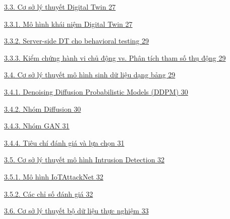 \hyperref[cux1a1-sux1edf-luxfd-thuyux1ebft-digital-twin]{3.3. Cơ sở lý thuyết Digital Twin \hyperref[cux1a1-sux1edf-luxfd-thuyux1ebft-digital-twin]{27}}

\hyperref[muxf4-huxecnh-khuxe1i-niux1ec7m-digital-twin]{3.3.1. Mô hình khái niệm Digital Twin \hyperref[muxf4-huxecnh-khuxe1i-niux1ec7m-digital-twin]{27}}

\hyperref[server-side-dt-cho-behavioral-testing]{3.3.2. Server-side DT cho behavioral testing \hyperref[server-side-dt-cho-behavioral-testing]{29}}

\hyperref[kiux1ec3m-chux1ee9ng-huxe0nh-vi-chux1ee7-ux111ux1ed9ng-vs.-phuxe2n-tuxedch-tham-sux1ed1-thux1ee5-ux111ux1ed9ng]{3.3.3. Kiểm chứng hành vi chủ động vs. Phân tích tham số thụ động \hyperref[kiux1ec3m-chux1ee9ng-huxe0nh-vi-chux1ee7-ux111ux1ed9ng-vs.-phuxe2n-tuxedch-tham-sux1ed1-thux1ee5-ux111ux1ed9ng]{29}}

\hyperref[cux1a1-sux1edf-luxfd-thuyux1ebft-muxf4-huxecnh-sinh-dux1eef-liux1ec7u-dux1ea1ng-bux1ea3ng]{3.4. Cơ sở lý thuyết mô hình sinh dữ liệu dạng bảng \hyperref[cux1a1-sux1edf-luxfd-thuyux1ebft-muxf4-huxecnh-sinh-dux1eef-liux1ec7u-dux1ea1ng-bux1ea3ng]{29}}

\hyperref[denoising-diffusion-probabilistic-models-ddpm]{3.4.1. Denoising Diffusion Probabilistic Models (DDPM) \hyperref[denoising-diffusion-probabilistic-models-ddpm]{30}}

\hyperref[nhuxf3m-diffusion]{3.4.2. Nhóm Diffusion \hyperref[nhuxf3m-diffusion]{30}}

\hyperref[nhuxf3m-gan]{3.4.3. Nhóm GAN \hyperref[nhuxf3m-gan]{31}}

\hyperref[tiuxeau-chuxed-ux111uxe1nh-giuxe1-vuxe0-lux1ef1a-chux1ecdn]{3.4.4. Tiêu chí đánh giá và lựa chọn \hyperref[tiuxeau-chuxed-ux111uxe1nh-giuxe1-vuxe0-lux1ef1a-chux1ecdn]{31}}

\hyperref[cux1a1-sux1edf-luxfd-thuyux1ebft-muxf4-huxecnh-intrusion-detection]{3.5. Cơ sở lý thuyết mô hình Intrusion Detection \hyperref[cux1a1-sux1edf-luxfd-thuyux1ebft-muxf4-huxecnh-intrusion-detection]{32}}

\hyperref[muxf4-huxecnh-iotattacknet]{3.5.1. Mô hình IoTAttackNet \hyperref[muxf4-huxecnh-iotattacknet]{32}}

\hyperref[cuxe1c-chux1ec9-sux1ed1-ux111uxe1nh-giuxe1]{3.5.2. Các chỉ số đánh giá \hyperref[cuxe1c-chux1ec9-sux1ed1-ux111uxe1nh-giuxe1]{32}}

\hyperref[cux1a1-sux1edf-luxfd-thuyux1ebft-bux1ed9-dux1eef-liux1ec7u-thux1ef1c-nghiux1ec7m]{3.6. Cơ sở lý thuyết bộ dữ liệu thực nghiệm \hyperref[cux1a1-sux1edf-luxfd-thuyux1ebft-bux1ed9-dux1eef-liux1ec7u-thux1ef1c-nghiux1ec7m]{33}}

